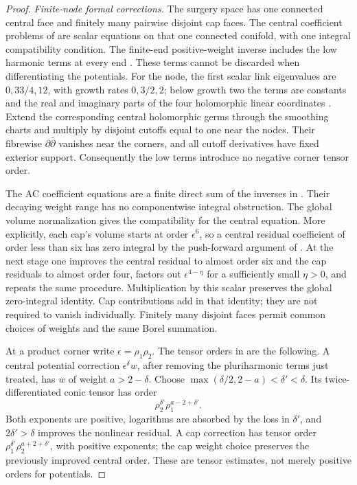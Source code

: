 \begin{proof}
\emph{Finite-node formal corrections.}
The surgery space has one connected central face and finitely many pairwise
disjoint cap faces. The central coefficient problems of
\cite[\S\S5--6]{benabida} are scalar equations on that one connected
conifold, with one integral compatibility condition. The finite-end
positive-weight inverse includes the low harmonic terms at every end
\cite[Proposition~3.4]{benabida}. These terms cannot be discarded when
differentiating the potentials. For the node, the first scalar link
eigenvalues are $0,33/4,12$, with growth rates $0,3/2,2$; below growth two
the terms are constants and the real and imaginary parts of the four
holomorphic linear coordinates \cite[Theorem~2.14(1), Example~2.16]{hein-sun}.
Extend the corresponding central holomorphic germs through the smoothing
charts and multiply by disjoint cutoffs equal to one near the nodes.
Their fibrewise $\partial\bar\partial$ vanishes near the corners, and
all cutoff derivatives have fixed exterior support. Consequently the low
terms introduce no negative corner tensor order.

The AC coefficient equations are a finite direct sum of the inverses in
\cite[Proposition~3.6]{benabida}. Their decaying weight range has no
componentwise integral obstruction. The global volume normalization gives
the compatibility for the central equation. More explicitly, each cap's
volume starts at order $\epsilon^6$, so a central residual coefficient
of order less than six has zero integral by the push-forward argument of
\cite[Proposition~5.5]{benabida}. At the next stage one improves the
central residual to almost order six and the cap residuals to almost order
four, factors out $\epsilon^{4-\eta}$ for a sufficiently small $\eta>0$,
and repeats the same procedure. Multiplication by this scalar preserves
the global zero-integral identity. Cap contributions add in that identity;
they are not required to vanish individually. Finitely many disjoint faces
permit common choices of weights and the same Borel summation.

At a product corner write $\epsilon=\rho_1\rho_2$. The tensor orders in
\cite[proof of Proposition~6.1]{benabida} are the following. A central
potential correction $\epsilon^\delta w$, after removing the
pluriharmonic terms just treated, has $w$ of weight $a>2-\delta$.
Choose $\max(\delta/2,2-a)<\delta'<\delta$. Its twice-differentiated
conic tensor has order
\[
 \rho_2^{\delta'}\rho_1^{a-2+\delta'}.
\]
Both exponents are positive, logarithms are absorbed by the loss in
$\delta'$, and $2\delta'>\delta$ improves the nonlinear residual.
A cap correction has tensor order
$\rho_1^{\delta'}\rho_2^{a+2+\delta'}$, with positive exponents;
the cap weight choice preserves the previously improved central order.
These are tensor estimates, not merely positive orders for potentials.


\end{proof}
